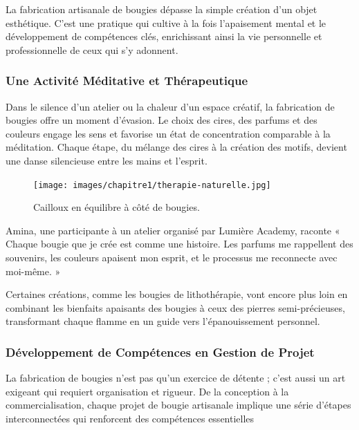 \documentclass[11pt,fleqn,onecolumn,oneside]{book}
\begin{document}
\begin{remark}
La fabrication artisanale de bougies dépasse la simple création d’un objet esthétique. C’est une pratique qui cultive à la fois l’apaisement mental et le développement de compétences clés, enrichissant ainsi la vie personnelle et professionnelle de ceux qui s’y adonnent.
\end{remark}

\subsubsection*{Une Activité Méditative et Thérapeutique}

Dans le silence d’un atelier ou la chaleur d’un espace créatif, la fabrication de bougies offre un moment d’évasion. Le choix des cires, des parfums et des couleurs engage les sens et favorise un état de concentration comparable à la méditation. Chaque étape, du mélange des cires à la création des motifs, devient une danse silencieuse entre les mains et l’esprit.

\begin{figure}[htbp]
    \centering
    \texttt{[image: images/chapitre1/therapie-naturelle.jpg]}
    \caption{Cailloux en équilibre à côté de bougies.}
    \label{fig:cedrus_atlantica}
\end{figure}

\begin{example}
Amina, une participante à un atelier organisé par Lumière Academy, raconte « Chaque bougie que je crée est comme une histoire. Les parfums me rappellent des souvenirs, les couleurs apaisent mon esprit, et le processus me reconnecte avec moi-même. »
\end{example}

Certaines créations, comme les bougies de lithothérapie, vont encore plus loin en combinant les bienfaits apaisants des bougies à ceux des pierres semi-précieuses, transformant chaque flamme en un guide vers l’épanouissement personnel.

\subsubsection*{Développement de Compétences en Gestion de Projet}

La fabrication de bougies n’est pas qu’un exercice de détente ; c’est aussi un art exigeant qui requiert organisation et rigueur. De la conception à la commercialisation, chaque projet de bougie artisanale implique une série d’étapes interconnectées qui renforcent des compétences essentielles
\end{document}
